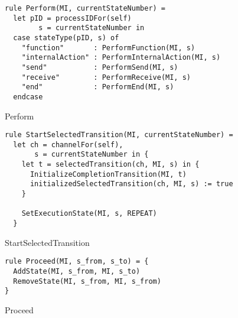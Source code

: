 \begin{listing}[H]
\begin{verbatim}
rule Perform(MI, currentStateNumber) =
  let pID = processIDFor(self)
        s = currentStateNumber in
  case stateType(pID, s) of
    "function"       : PerformFunction(MI, s)
    "internalAction" : PerformInternalAction(MI, s)
    "send"           : PerformSend(MI, s)
    "receive"        : PerformReceive(MI, s)
    "end"            : PerformEnd(MI, s)
  endcase
\end{verbatim}
\caption{Perform}
\label{lst:asm:Perform}
\end{listing}




\begin{listing}[H]
\begin{verbatim}
rule StartSelectedTransition(MI, currentStateNumber) =
  let ch = channelFor(self),
       s = currentStateNumber in {
    let t = selectedTransition(ch, MI, s) in {
      InitializeCompletionTransition(MI, t)
      initializedSelectedTransition(ch, MI, s) := true
    }

    SetExecutionState(MI, s, REPEAT)
  }
\end{verbatim}
\caption{StartSelectedTransition}
\label{lst:asm:StartSelectedTransition}
\end{listing}






\begin{listing}[H]
\begin{verbatim}
rule Proceed(MI, s_from, s_to) = {
  AddState(MI, s_from, MI, s_to)
  RemoveState(MI, s_from, MI, s_from)
}
\end{verbatim}
\caption{Proceed}
\label{lst:asm:Proceed}
\end{listing}




